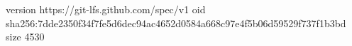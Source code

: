 version https://git-lfs.github.com/spec/v1
oid sha256:7dde2350f34f7fe5d6dec94ac4652d0584a668c97e4f5b06d59529f737f1b3bd
size 4530
